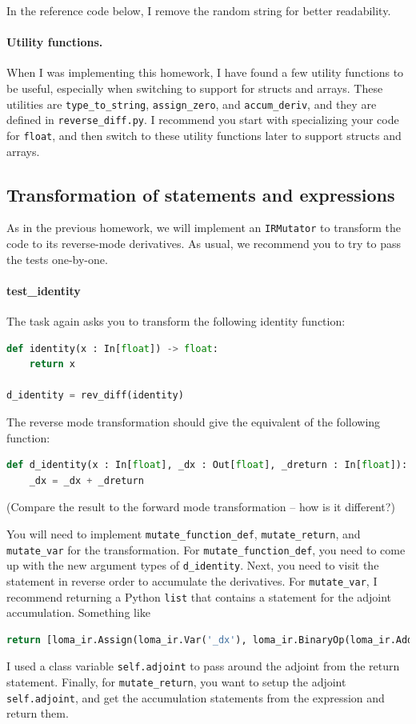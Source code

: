 In the reference code below, I remove the random string for better readability.

\paragraph{Utility functions.} When I was implementing this homework, I have found a few utility functions to be useful, especially when switching to support for structs and arrays. These utilities are \lstinline{type_to_string}, \lstinline{assign_zero}, and \lstinline{accum_deriv}, and they are defined in \lstinline{reverse_diff.py}. I recommend you start with specializing your code for \lstinline{float}, and then switch to these utility functions later to support structs and arrays.

\subsection{Transformation of statements and expressions}
As in the previous homework, we will implement an \lstinline{IRMutator} to transform the code to its reverse-mode derivatives. As usual, we recommend you to try to pass the tests one-by-one. 

\paragraph{test_identity} The task again asks you to transform the following identity function:
\begin{lstlisting}[language=Python]
def identity(x : In[float]) -> float:
    return x

d_identity = rev_diff(identity)
\end{lstlisting}
The reverse mode transformation should give the equivalent of the following function:
\begin{lstlisting}[language=Python]
def d_identity(x : In[float], _dx : Out[float], _dreturn : In[float]):
	_dx = _dx + _dreturn
\end{lstlisting}
(Compare the result to the forward mode transformation -- how is it different?)

You will need to implement \lstinline{mutate_function_def}, \lstinline{mutate_return}, and \lstinline{mutate_var} for the transformation. For \lstinline{mutate_function_def}, you need to come up with the new argument types of \lstinline{d_identity}. Next, you need to visit the statement in reverse order to accumulate the derivatives. For \lstinline{mutate_var}, I recommend returning a Python \lstinline{list} that contains a statement for the adjoint accumulation. Something like 
\begin{lstlisting}[language=Python]
return [loma_ir.Assign(loma_ir.Var('_dx'), loma_ir.BinaryOp(loma_ir.Add(), loma_ir.Var('_dx'), loma_ir.Var('_dreturn')))]
\end{lstlisting}
I used a class variable \lstinline{self.adjoint} to pass around the adjoint from the return statement.
Finally, for \lstinline{mutate_return}, you want to setup the adjoint \lstinline{self.adjoint}, and get the accumulation statements from the expression and return them.

